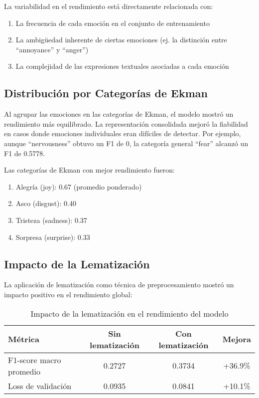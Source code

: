 \documentclass[12pt,a4paper]{report}
\begin{document}
La variabilidad en el rendimiento está directamente relacionada con:
\begin{enumerate}
  \item La frecuencia de cada emoción en el conjunto de entrenamiento
  \item La ambigüedad inherente de ciertas emociones (ej. la distinción entre ``annoyance'' y ``anger'')
  \item La complejidad de las expresiones textuales asociadas a cada emoción
\end{enumerate}

\subsection{Distribución por Categorías de Ekman}

Al agrupar las emociones en las categorías de Ekman, el modelo mostró un rendimiento más equilibrado. La representación consolidada mejoró la fiabilidad en casos donde emociones individuales eran difíciles de detectar. Por ejemplo, aunque ``nervousness'' obtuvo un F1 de 0, la categoría general ``fear'' alcanzó un F1 de 0.5778.

Las categorías de Ekman con mejor rendimiento fueron:
\begin{enumerate}
  \item Alegría (joy): 0.67 (promedio ponderado)
  \item Asco (disgust): 0.40
  \item Tristeza (sadness): 0.37
  \item Sorpresa (surprise): 0.33
\end{enumerate}

\subsection{Impacto de la Lematización}

La aplicación de lematización como técnica de preprocesamiento mostró un impacto positivo en el rendimiento global:

\begin{table}[htbp]
  \centering
  \caption{Impacto de la lematización en el rendimiento del modelo}
  \begin{tabular}{lccc}
    \toprule
    \textbf{Métrica} & \textbf{Sin lematización} & \textbf{Con lematización} & \textbf{Mejora} \\
    \midrule
    F1-score macro promedio & 0.2727 & 0.3734 & +36.9\% \\
    Loss de validación & 0.0935 & 0.0841 & +10.1\% \\
    \bottomrule
  \end{tabular}
\end{table}
\end{document}
